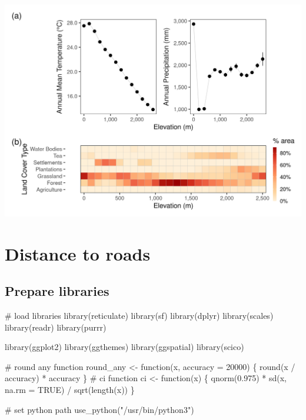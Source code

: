 \documentclass[]{article}
\newenvironment{Shaded}{}{}
\newcommand{\CommentTok}[1]{\textcolor[rgb]{0.00,0.50,0.00}{#1}}
\newcommand{\ControlFlowTok}[1]{\textcolor[rgb]{0.00,0.00,1.00}{#1}}
\newcommand{\DataTypeTok}[1]{#1}
\newcommand{\DecValTok}[1]{#1}
\newcommand{\FloatTok}[1]{#1}
\newcommand{\KeywordTok}[1]{\textcolor[rgb]{0.00,0.00,1.00}{#1}}
\newcommand{\NormalTok}[1]{#1}
\newcommand{\OperatorTok}[1]{#1}
\newcommand{\OtherTok}[1]{\textcolor[rgb]{1.00,0.25,0.00}{#1}}
\newcommand{\StringTok}[1]{\textcolor[rgb]{0.00,0.50,0.50}{#1}}
\begin{document}
\includegraphics{figs/fig_02_clim_lc_elev.png}

\hypertarget{distance-to-roads}{%
\section{Distance to roads}\label{distance-to-roads}}

\hypertarget{prepare-libraries-1}{%
\subsection{Prepare libraries}\label{prepare-libraries-1}}

\begin{Shaded}
\begin{Highlighting}[]
\CommentTok{# load libraries}
\KeywordTok{library}\NormalTok{(reticulate)}
\KeywordTok{library}\NormalTok{(sf)}
\KeywordTok{library}\NormalTok{(dplyr)}
\KeywordTok{library}\NormalTok{(scales)}
\KeywordTok{library}\NormalTok{(readr)}
\KeywordTok{library}\NormalTok{(purrr)}

\KeywordTok{library}\NormalTok{(ggplot2)}
\KeywordTok{library}\NormalTok{(ggthemes)}
\KeywordTok{library}\NormalTok{(ggspatial)}
\KeywordTok{library}\NormalTok{(scico)}

\CommentTok{# round any function}
\NormalTok{round_any <-}\StringTok{ }\ControlFlowTok{function}\NormalTok{(x, }\DataTypeTok{accuracy =} \DecValTok{20000}\NormalTok{) \{}
  \KeywordTok{round}\NormalTok{(x }\OperatorTok{/}\StringTok{ }\NormalTok{accuracy) }\OperatorTok{*}\StringTok{ }\NormalTok{accuracy}
\NormalTok{\}}
\CommentTok{# ci function}
\NormalTok{ci <-}\StringTok{ }\ControlFlowTok{function}\NormalTok{(x) \{}
  \KeywordTok{qnorm}\NormalTok{(}\FloatTok{0.975}\NormalTok{) }\OperatorTok{*}\StringTok{ }\KeywordTok{sd}\NormalTok{(x, }\DataTypeTok{na.rm =} \OtherTok{TRUE}\NormalTok{) }\OperatorTok{/}\StringTok{ }\KeywordTok{sqrt}\NormalTok{(}\KeywordTok{length}\NormalTok{(x))}
\NormalTok{\}}

\CommentTok{# set python path}
\KeywordTok{use_python}\NormalTok{(}\StringTok{"/usr/bin/python3"}\NormalTok{)}
\end{Highlighting}
\end{Shaded}
\end{document}
